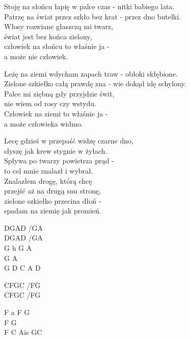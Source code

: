 \begin{text}
    Stoję na słońcu łapię w palce czas - nitki babiego lata.\\
    Patrzę na świat przez szkło bez krat - przez dno butelki.\\
    Włosy rozwiane głaszczą mi twarz,\\
    świat jest bez końca zielony,\\
    człowiek na słońcu to właśnie ja -\\
    a może nie człowiek.

    Leżę na ziemi wdycham zapach traw - obłoki skłębione.\\
    Zielone szkiełko całą prawdę zna - wie dokąd idę schylony.\\
    Palce mi ziębną gdy przyjdzie świt,\\
    nie wiem od rosy czy wstydu.\\
    Człowiek na ziemi to właśnie ja -\\
    a może człowieka widmo.

    Lecę gdzieś w przepaść widzę czarne dno,\\
    słyszę jak krew stygnie w żyłach.\\
    Spływa po twarzy powietrza prąd -\\
    to cel mnie znalazł i wybrał.\\
    Znalazłem drogę, którą chcę\\
    przejść aż na drugą snu stronę,\\
    zielone szkiełko przecina dłoń -\\
    spadam na ziemię jak promień.
\end{text}
\begin{chord}
    DGAD /GA\\
    DGAD /GA\\
    G h G A\\
    G A\\
    G D C A D

    CFGC /FG\\
    CFGC /FG

    F a F G\\
    F G\\
    F C Ais GC
\end{chord}